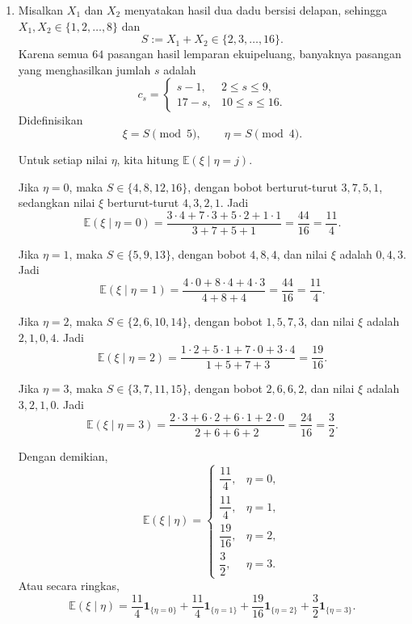 \documentclass[11pt,a4paper]{article}
\newcommand{\E}{\mathbb{E}}
\begin{document}
\begin{enumerate}[leftmargin=*, itemsep=0.6cm]
  \item Misalkan $X_1$ dan $X_2$ menyatakan hasil dua dadu bersisi delapan, sehingga
        $X_1,X_2\in\{1,2,\ldots,8\}$ dan
        \[
          S:=X_1+X_2\in\{2,3,\ldots,16\}.
        \]
        Karena semua $64$ pasangan hasil lemparan ekuipeluang, banyaknya pasangan yang
        menghasilkan jumlah $s$ adalah
        \[
          c_s=
          \begin{cases}
            s-1, & 2\le s\le 9,\\
            17-s, & 10\le s\le 16.
          \end{cases}
        \]
        Didefinisikan
        \[
          \xi=S \pmod 5,\qquad \eta=S \pmod 4.
        \]

        Untuk setiap nilai $\eta$, kita hitung $\E(\xi\mid \eta=j)$.

        Jika $\eta=0$, maka $S\in\{4,8,12,16\}$, dengan bobot berturut-turut
        $3,7,5,1$, sedangkan nilai $\xi$ berturut-turut $4,3,2,1$. Jadi
        \[
          \E(\xi\mid\eta=0)
          =\frac{3\cdot 4+7\cdot 3+5\cdot 2+1\cdot 1}{3+7+5+1}
          =\frac{44}{16}
          =\frac{11}{4}.
        \]

        Jika $\eta=1$, maka $S\in\{5,9,13\}$, dengan bobot $4,8,4$, dan nilai
        $\xi$ adalah $0,4,3$. Jadi
        \[
          \E(\xi\mid\eta=1)
          =\frac{4\cdot 0+8\cdot 4+4\cdot 3}{4+8+4}
          =\frac{44}{16}
          =\frac{11}{4}.
        \]

        Jika $\eta=2$, maka $S\in\{2,6,10,14\}$, dengan bobot $1,5,7,3$, dan nilai
        $\xi$ adalah $2,1,0,4$. Jadi
        \[
          \E(\xi\mid\eta=2)
          =\frac{1\cdot 2+5\cdot 1+7\cdot 0+3\cdot 4}{1+5+7+3}
          =\frac{19}{16}.
        \]

        Jika $\eta=3$, maka $S\in\{3,7,11,15\}$, dengan bobot $2,6,6,2$, dan nilai
        $\xi$ adalah $3,2,1,0$. Jadi
        \[
          \E(\xi\mid\eta=3)
          =\frac{2\cdot 3+6\cdot 2+6\cdot 1+2\cdot 0}{2+6+6+2}
          =\frac{24}{16}
          =\frac{3}{2}.
        \]

        Dengan demikian,
        \[
          \E(\xi\mid\eta)=
          \begin{cases}
            \dfrac{11}{4}, & \eta=0,\\[1mm]
            \dfrac{11}{4}, & \eta=1,\\[1mm]
            \dfrac{19}{16}, & \eta=2,\\[1mm]
            \dfrac{3}{2}, & \eta=3.
          \end{cases}
        \]
        Atau secara ringkas,
        \[
          \E(\xi\mid\eta)
          =\frac{11}{4}\mathbf{1}_{\{\eta=0\}}
          +\frac{11}{4}\mathbf{1}_{\{\eta=1\}}
          +\frac{19}{16}\mathbf{1}_{\{\eta=2\}}
          +\frac{3}{2}\mathbf{1}_{\{\eta=3\}}.
        \]


\end{enumerate}
\end{document}
